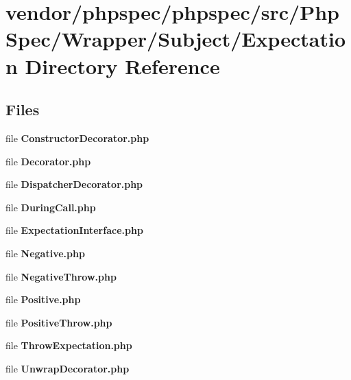 \section{vendor/phpspec/phpspec/src/\+Php\+Spec/\+Wrapper/\+Subject/\+Expectation Directory Reference}
\label{dir_dca44edd611e3da99293c20ff24800fd}
\subsection*{Files}
\begin{DoxyCompactItemize}
\item 
file {\bf Constructor\+Decorator.\+php}
\item 
file {\bf Decorator.\+php}
\item 
file {\bf Dispatcher\+Decorator.\+php}
\item 
file {\bf During\+Call.\+php}
\item 
file {\bf Expectation\+Interface.\+php}
\item 
file {\bf Negative.\+php}
\item 
file {\bf Negative\+Throw.\+php}
\item 
file {\bf Positive.\+php}
\item 
file {\bf Positive\+Throw.\+php}
\item 
file {\bf Throw\+Expectation.\+php}
\item 
file {\bf Unwrap\+Decorator.\+php}
\end{DoxyCompactItemize}
